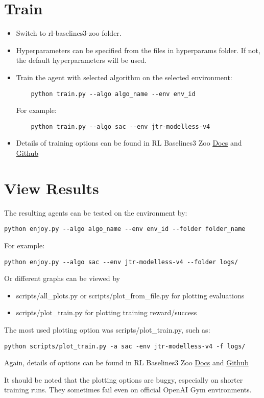 \section{Train}
\begin{itemize}
    \item Switch to rl-baselines3-zoo folder.
    \item Hyperparameters can be specified from the files in hyperparams folder. If not, the default hyperparameters will be used.
    \item Train the agent with selected algorithm on the selected environment:
    \begin{lstlisting}
    python train.py --algo algo_name --env env_id
    \end{lstlisting}
    For example:
        \begin{lstlisting}
    python train.py --algo sac --env jtr-modelless-v4
    \end{lstlisting}
    \item Details of training options can be found in RL Baselines3 Zoo \href{https://stable-baselines3.readthedocs.io/en/master/guide/rl_zoo.html}{\underline{Docs}} and \href{https://github.com/DLR-RM/rl-baselines3-zoo}{\underline{Github}}
\end{itemize}

\section{View Results}
The resulting agents can be tested on the environment by:
\begin{lstlisting}
python enjoy.py --algo algo_name --env env_id --folder folder_name
\end{lstlisting}
For example:
\begin{lstlisting}
python enjoy.py --algo sac --env jtr-modelless-v4 --folder logs/
\end{lstlisting}

\noindent
Or different graphs can be viewed by
\begin{itemize}
    \item scripts/all\_plots.py or scripts/plot\_from\_file.py for plotting evaluations
    \item scripts/plot\_train.py for plotting training reward/success
\end{itemize}

\noindent
The most used plotting option was scripts/plot\_train.py, such as:
\begin{lstlisting}
python scripts/plot_train.py -a sac -env jtr-modelless-v4 -f logs/
\end{lstlisting}

\noindent
Again, details of options can be found in RL Baselines3 Zoo \href{https://stable-baselines3.readthedocs.io/en/master/guide/rl_zoo.html}{\underline{Docs}} and \href{https://github.com/DLR-RM/rl-baselines3-zoo}{\underline{Github}}

It should be noted that the plotting options are buggy, especially on shorter training runs. They sometimes fail even on official OpenAI Gym environments.

